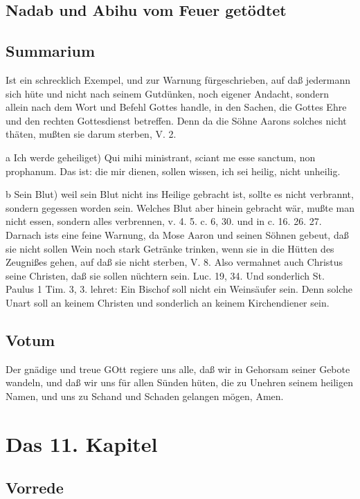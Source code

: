 \section{Nadab und Abihu vom Feuer getödtet}

\section{Summarium}

Ist ein schrecklich Exempel, und zur Warnung fürgeschrieben, auf daß jedermann sich hüte und nicht nach seinem Gutdünken, noch eigener Andacht, sondern allein nach dem Wort und Befehl Gottes handle, in den Sachen, die Gottes Ehre und den rechten Gottesdienst betreffen. Denn da die Söhne Aarons solches nicht thäten, mußten sie darum sterben, V. 2.

a Ich werde geheiliget) Qui mihi ministrant, sciant me esse sanctum, non prophanum. Das ist: die mir dienen, sollen wissen, ich sei heilig, nicht unheilig.

b Sein Blut) weil sein Blut nicht ins Heilige gebracht ist, sollte es nicht verbrannt, sondern gegessen worden sein. Welches Blut aber hinein gebracht wär, mußte man nicht essen, sondern alles verbrennen, v. 4. 5. c. 6, 30. und in c. 16. 26. 27.
Darnach ists eine feine Warnung, da Mose Aaron und seinen Söhnen gebeut, daß sie nicht sollen Wein noch stark Getränke trinken, wenn sie in die Hütten des Zeugnißes gehen, auf daß sie nicht sterben, V. 8. Also vermahnet auch Christus seine Christen, daß sie sollen nüchtern sein. Luc. 19, 34. Und sonderlich St. Paulus 1 Tim. 3, 3. lehret: Ein Bischof soll nicht ein Weinsäufer sein. Denn solche Unart soll an keinem Christen und sonderlich an keinem Kirchendiener sein.

\section{Votum}

Der gnädige und treue GOtt regiere uns alle, daß wir in Gehorsam seiner Gebote wandeln, und daß wir uns für allen Sünden hüten, die zu Unehren seinem heiligen Namen, und uns zu Schand und Schaden gelangen mögen, Amen.

\chapter{Das 11. Kapitel}

\section{Vorrede}

